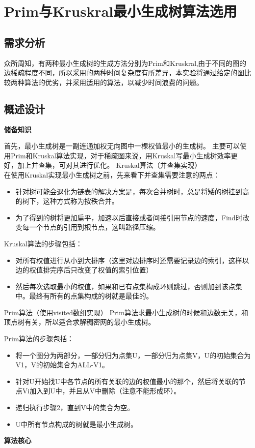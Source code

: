 \documentclass[UTF8,a4paper]{article}
\begin{document}
\section{Prim与Kruskral最小生成树算法选用}
\subsection{需求分析}
众所周知，有两种最小生成树的生成方法分别为Prim和Kruskral,由于不同的图的边稀疏程度不同，所以采用的两种时间复杂度有所差异，本实验将通过给定的图比较两种算法的优劣，并采用适用的算法，以减少时间浪费的问题。\\
\subsection{概述设计}
\textbf{\large{储备知识}}

首先，最小生成树是一副连通加权无向图中一棵权值最小的生成树。
主要可以使用Prim和Kruskal算法实现，对于稀疏图来说，用Kruskal写最小生成树效率更好，加上并查集，可对其进行优化。
Kruskal算法（并查集实现）\\
在使用Kruskal实现最小生成树之前，先来看下并查集需要注意的两点：
\begin{itemize}
\item 针对树可能会退化为链表的解决方案是，每次合并树时，总是将矮的树挂到高的树下，这种方式称为按秩合并。
\item 为了得到的树将更加扁平，加速以后直接或者间接引用节点的速度，Find时改变每一个节点的引用到根节点，这叫路径压缩。
\end{itemize}
Kruskal算法的步骤包括：
\begin{itemize}
    \item 对所有权值进行从小到大排序（这里对边排序时还需要记录边的索引，这样以边的权值排完序后只改变了权值的索引位置）
    \item 然后每次选取最小的权值，如果和已有点集构成环则跳过，否则加到该点集中。最终有所有的点集构成的树就是最佳的。
\end{itemize}
Prim算法（使用visited数组实现）
Prim算法求最小生成树的时候和边数无关，和顶点树有关，所以适合求解稠密网的最小生成树。

Prim算法的步骤包括：
\begin{itemize}
\item 将一个图分为两部分，一部分归为点集U，一部分归为点集V，U的初始集合为{V1}，V的初始集合为{ALL-V1}。

\item 针对U开始找U中各节点的所有关联的边的权值最小的那个，然后将关联的节点Vi加入到U中，并且从V中删除（注意不能形成环）。

\item 递归执行步骤2，直到V中的集合为空。

\item U中所有节点构成的树就是最小生成树。
\end{itemize}
\textbf{\large{算法核心}}
\end{document}
